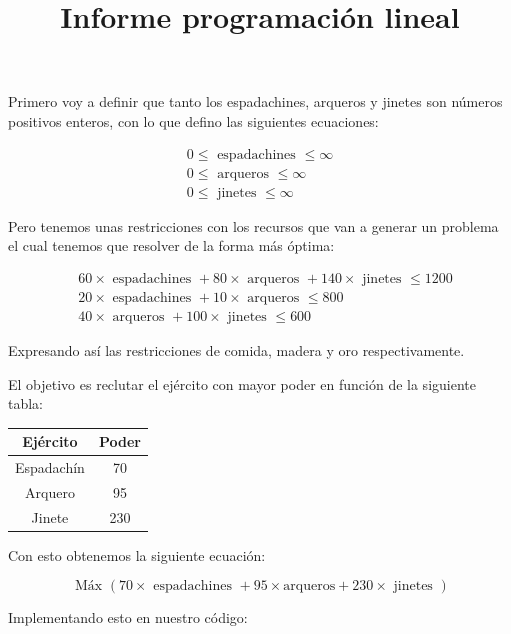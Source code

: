 \documentclass[10pt]{article}
\title{Informe programación lineal }
\author{}
\date{}
\begin{document}
\maketitle
Primero voy a definir que tanto los espadachines, arqueros y jinetes son números positivos enteros, con lo que defino las siguientes ecuaciones:

$$
\begin{gathered}
0 \leq \text { espadachines } \leq \infty \\
0 \leq \text { arqueros } \leq \infty \\
0 \leq \text { jinetes } \leq \infty
\end{gathered}
$$

Pero tenemos unas restricciones con los recursos que van a generar un problema el cual tenemos que resolver de la forma más óptima:

$$
\begin{aligned}
& 60 \times \text { espadachines }+80 \times \text { arqueros }+140 \times \text { jinetes } \leq 1200 \\
& 20 \times \text { espadachines }+10 \times \text { arqueros } \leq 800 \\
& 40 \times \text { arqueros }+100 \times \text { jinetes } \leq 600
\end{aligned}
$$

Expresando así las restricciones de comida, madera y oro respectivamente.

El objetivo es reclutar el ejército con mayor poder en función de la siguiente tabla:

\begin{center}
\begin{tabular}{|c|c|}
\hline
Ejército & Poder \\
\hline
Espadachín & 70 \\
\hline
Arquero & 95 \\
\hline
Jinete & 230 \\
\hline
\end{tabular}
\end{center}

Con esto obtenemos la siguiente ecuación:

$$
\text { Máx }(70 \times \text { espadachines }+95 \times \text {arqueros}+230 \times \text { jinetes })
$$

Implementando esto en nuestro código:
\end{document}
